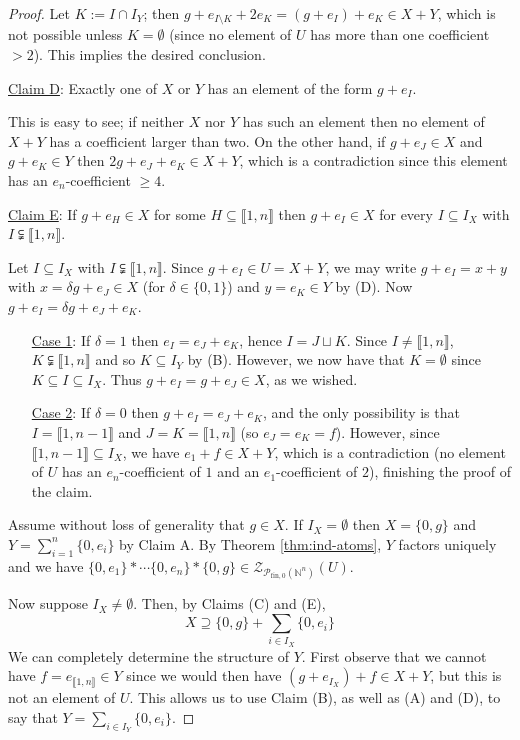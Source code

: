 \documentclass{report}
\newcommand{\NN}{\mathbb{N}}
\renewcommand{\P}{\mathcal{P}}
\newcommand{\Z}{\mathcal{Z}}
\newcommand{\llb}{\llbracket}
\newcommand{\rrb}{\rrbracket}
\newcommand{\fon}{{\textrm{fin}, 0}}
\renewcommand{\:}{\text{:}}
\theoremstyle{definition}
\begin{document}
\begin{proof}
Let $K := I\cap I_Y$; then $g + e_{I\setminus K} + 2e_K = (g+e_I) + e_K \in X+Y$, which is not possible unless $K=\emptyset$ (since no element of $U$ has more than one coefficient $>2$).
This implies the desired conclusion.

\noindent\underline{Claim D}: Exactly one of $X$ or $Y$ has an element of the form $g + e_I$. 

This is easy to see; if neither $X$ nor $Y$ has such an element then no element of $X+Y$ has a coefficient larger than two.
On the other hand, if $g+e_J\in X$ and $g+e_K\in Y$ then $2g + e_J + e_K \in X+Y$, which is a contradiction since this element has an $e_n$-coefficient $\ge 4$.

\noindent\underline{Claim E}: If $g+ e_H\in X$ for some $H\subseteq \llb 1,n \rrb$ then $g + e_I \in X$ for every $I\subseteq I_X$ with $I\subsetneqq \llb 1,n\rrb$. 

Let $I \subseteq I_X$ with $I\subsetneqq \llb1,n\rrb$.
Since $g+e_I\in U = X+Y$, we may write $g+e_I = x +y$ with $x = \delta g + e_J\in X$ (for $\delta\in \{0,1\}$) and $y=e_K\in Y$ by (D).
Now $g + e_I = \delta g + e_J + e_K$.
\begin{itemize}
\item[\underline{Case 1}:] If $\delta = 1$ then $e_I = e_J + e_K$, hence $I = J\sqcup K$. 
Since $I\neq \llb1,n\rrb$, $K\subsetneqq \llb 1,n \rrb$ and so $K\subseteq I_Y$ by (B).
However, we now have that $K = \emptyset$ since $K\subseteq I \subseteq I_X$.
Thus $g + e_I = g + e_J \in X$, as we wished.
\item[\underline{Case 2}:] If $\delta = 0$ then $g + e_I = e_J + e_K$, and the only possibility is that $I = \llb 1,n-1\rrb$ and $J = K = \llb 1,n\rrb$ (so $e_J = e_K = f$).
However, since $\llb 1,n-1 \rrb \subseteq I_X$, we have $e_1 + f \in X+Y$, which is a contradiction (no element of $U$ has an $e_n$-coefficient of $1$ and an $e_1$-coefficient of $2$), finishing the proof of the claim.
\end{itemize}

Assume without loss of generality that $g\in X$.
If $I_X = \emptyset$ then $X = \{0,g\}$ and $Y = \sum_{i=1}^n \{0,e_i\}$ by Claim A.
By Theorem \ref{thm:ind-atoms}, $Y$ factors uniquely and we have $\{0,e_1\}*\cdots \{0,e_n\}*\{0,g\}\in \Z_{\P_\fon(\NN^n)}(U)$.

Now suppose $I_X \neq \emptyset$.
Then, by Claims (C) and (E), 
\[X \supseteq \{0,g\} + \sum_{i\in I_X} \{0,e_i\} \tag{1} \label{factor-includes} \]
We can completely determine the structure of $Y$.
First observe that we cannot have $f=e_{\llb1,n\rrb}\in Y$ since we would then have $(g+e_{I_X})+f \in X+Y$, but this is not an element of $U$.
This allows us to use Claim (B), as well as (A) and (D), to say that $Y = \sum_{i\in I_Y} \{0,e_i\}$.


\end{proof}
\end{document}

